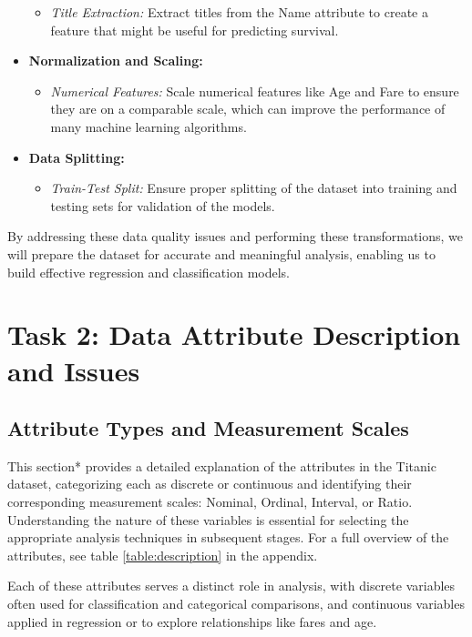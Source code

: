 \documentclass[twoside,11pt]{article}
\begin{document}
\begin{itemize}
\begin{itemize}
        \item \textit{Title Extraction:} Extract titles from the Name attribute to create a feature that might be useful for predicting survival.
    \end{itemize}
    \item \textbf{Normalization and Scaling:}
    \begin{itemize}
        \item \textit{Numerical Features:} Scale numerical features like Age and Fare to ensure they are on a comparable scale, which can improve the performance of many machine learning algorithms.
    \end{itemize}
    \item \textbf{Data Splitting:}
    \begin{itemize}
        \item \textit{Train-Test Split:} Ensure proper splitting of the dataset into training and testing sets for validation of the models.
    \end{itemize}
\end{itemize}

By addressing these data quality issues and performing these transformations, we will prepare the dataset for accurate and meaningful analysis, enabling us to build effective regression and classification models.


\section*{Task 2: Data Attribute Description and Issues}

\subsection*{Attribute Types and Measurement Scales}
This section* provides a detailed explanation of the attributes in the Titanic dataset, categorizing each as discrete or continuous and identifying their corresponding measurement scales: Nominal, Ordinal, Interval, or Ratio. Understanding the nature of these variables is essential for selecting the appropriate analysis techniques in subsequent stages. For a full overview of the attributes, see table \ref{table:description} in the appendix.

Each of these attributes serves a distinct role in analysis, with discrete variables often used for classification and categorical comparisons, and continuous variables applied in regression or to explore relationships like fares and age.
\end{document}
